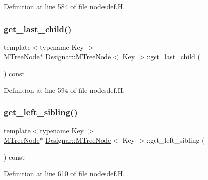 Definition at line 584 of file nodesdef.\+H.

\mbox{\label{class_designar_1_1_m_tree_node_a6b2089185feed25ae434f46584b83ffc}} 
\subsubsection{\texorpdfstring{get\+\_\+last\+\_\+child()}{get\_last\_child()}}
{\footnotesize\ttfamily template$<$typename Key $>$ \\
\hyperlink{class_designar_1_1_m_tree_node}{M\+Tree\+Node}$\ast$ \hyperlink{class_designar_1_1_m_tree_node}{Designar\+::\+M\+Tree\+Node}$<$ Key $>$\+::get\+\_\+last\+\_\+child (\begin{DoxyParamCaption}{ }\end{DoxyParamCaption}) const\hspace{0.3cm}{\ttfamily [inline]}}



Definition at line 594 of file nodesdef.\+H.

\mbox{\label{class_designar_1_1_m_tree_node_a10ec8a3f078b1f3d63773ca16602719c}} 
\subsubsection{\texorpdfstring{get\+\_\+left\+\_\+sibling()}{get\_left\_sibling()}}
{\footnotesize\ttfamily template$<$typename Key $>$ \\
\hyperlink{class_designar_1_1_m_tree_node}{M\+Tree\+Node}$\ast$ \hyperlink{class_designar_1_1_m_tree_node}{Designar\+::\+M\+Tree\+Node}$<$ Key $>$\+::get\+\_\+left\+\_\+sibling (\begin{DoxyParamCaption}{ }\end{DoxyParamCaption}) const\hspace{0.3cm}{\ttfamily [inline]}}



Definition at line 610 of file nodesdef.\+H.

